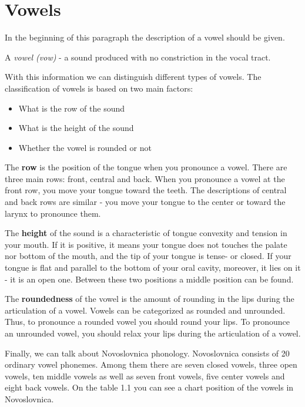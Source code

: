 \section{Vowels}

In the beginning of this paragraph the description of a vowel should be given.


A \textit{vowel (\gls{vow})} - a sound produced with no constriction in the vocal tract.

With this information we can distinguish different types of vowels. The classification of vowels is based on two main factors:

\begin{itemize}
	\item{What is the row of the sound}
	\item{What is the height of the sound}
	\item{Whether the vowel is rounded or not}
\end{itemize}

The \textbf{row} is the position of the tongue when you pronounce a vowel. There are three main rows: front, central and back. When you pronounce a vowel at the front row, you move your tongue toward the teeth. The descriptions of central and back rows are similar - you move your tongue to the center or toward the larynx to pronounce them.

The \textbf{height} of the sound is a characteristic of tongue convexity and tension in your mouth. If it is positive, it means your tongue does not touches the palate nor bottom of the mouth, and the tip of your tongue is tense- or closed. If your tongue is flat and parallel to the bottom of your oral cavity, moreover, it lies on it - it is an open one. Between these two positions a middle position can be found.

The \textbf{roundedness} of the vowel is the amount of rounding in the lips during the articulation of a vowel. Vowels can be categorized as rounded and unrounded. Thus, to pronounce a rounded vowel you should round your lips. To pronounce an unrounded vowel, you should relax your lips during the articulation of a vowel.

Finally, we can talk about Novoslovnica phonology. Novoslovnica consists of 20 ordinary vowel phonemes. Among them there are seven closed vowels, three open vowels, ten middle vowels as well as seven front vowels, five center vowels and eight back vowels. On the table 1.1 you can see a chart position of the vowels in Novoslovnica.


